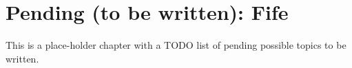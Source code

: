 

\chapter{Pending (to be written): Fife}


\setcounter{page}{1}
\renewcommand{\thepage}{\arabic{chapter}-\arabic{page}}

\label{ch_Fife_Pending}


This is a place-holder chapter with a TODO list of pending possible
topics to be written.

